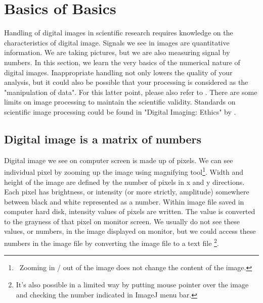 
\section{Basics of Basics}

Handling of digital images in scientific research requires knowledge on
the characteristics of digital image. Signals we see in images are
quantitative information. We are taking pictures, but we are also
measuring signal by numbers. In this section, we learn the very basics
of the numerical nature of digital images. Inappropriate handling not
only lowers the quality of your analysis, but it could also be possible
that your processing is considered as the "manipulation
of data". For this latter point, please also refer to
\citet{Rossner2004}. There are some limits on image processing
to maintain the scientific validity. Standards on scientific image
processing could be found in "Digital Imaging:
Ethics" by \citet{cromey2007}. 

\subsection{Digital image is a matrix of numbers}
\label{subsec:imageEQmatrix}
Digital image we see on computer screen is made up of pixels. We can see
individual pixel by zooming up the image using magnifying tool\footnote{\
Zooming in / out of the image does not change the content of the image.}. Width
and height of the image are defined by the number of pixels in x and y
directions. Each pixel has brightness, or intensity (or more strictly,
amplitude) somewhere between black and white represented as a number. Within
image file saved in computer hard disk, intensity values of pixels are
written. The value is converted to the grayness of that pixel on monitor screen.
We usually do not see these values, or numbers, in the image displayed on
monitor, but we could access these numbers in the image file by converting 
the image file to a text file \footnote{It's also possible in a limited way by
putting mouse pointer over the image and checking the number indicated in
ImageJ menu bar.}.

